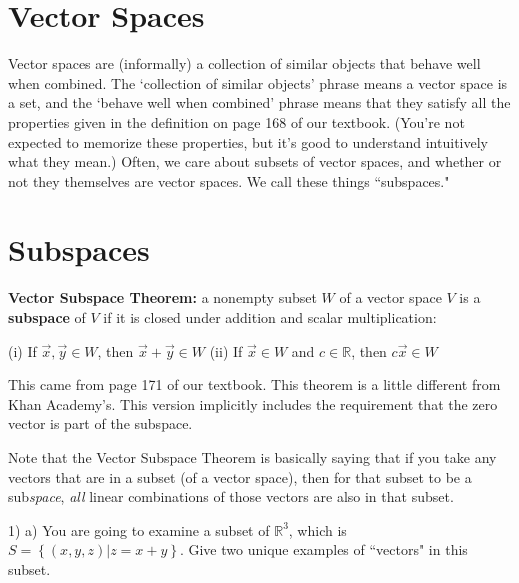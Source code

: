 \documentclass{article}
\begin{document}
\begin{flushleft}
\vspace{1.25in}

\section*{Vector Spaces}

Vector spaces are (informally) a collection of similar objects that behave well when combined.  The `collection of similar objects' phrase means a vector space is a set, and the `behave well when combined' phrase means that they satisfy all the properties given in the definition on page 168 of our textbook.  (You're not expected to memorize these properties, but it's good to understand intuitively what they mean.)  Often, we care about subsets of vector spaces, and whether or not they themselves are vector spaces.  We call these things ``subspaces."

\section*{Subspaces}

\textbf{Vector Subspace Theorem:} a nonempty subset $W$ of a vector space $V$ is a \textbf{subspace} of $V$ if it is closed under addition and scalar multiplication:

\vspace{0.2in}

(i) If $\vec{x},\vec{y}\in W$, then $\vec{x}+\vec{y}\in W$ \hspace{0.5in} (ii) If $\vec{x}\in W$ and $c\in \mathbb{R}$, then $c\vec{x} \in W$

\vspace{0.2in}

This came from page 171 of our textbook.  This theorem is a little different from Khan Academy's.  This version implicitly includes the requirement that the zero vector is part of the subspace.

\vspace{0.2in}

Note that the Vector Subspace Theorem is basically saying that if you take any vectors that are in a subset (of a vector space), then for that subset to be a sub\emph{space}, \emph{all} linear combinations of those vectors are also in that subset.

\pagebreak

1) a) You are going to examine a subset of $\mathbb{R}^3$, which is $S=\left\{ (x,y,z)| z = x + y \right\}$.  Give two unique examples of ``vectors" in this subset.


\end{flushleft}
\end{document}
